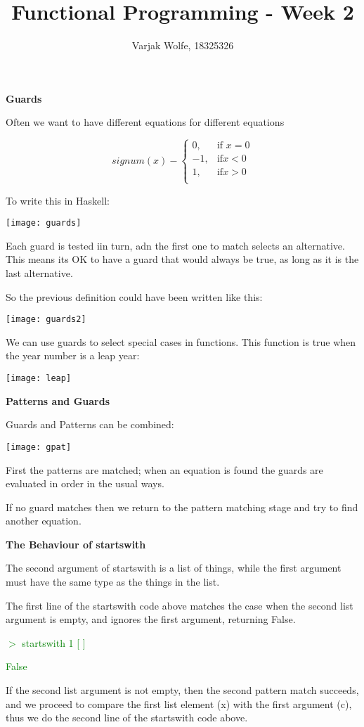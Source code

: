 \documentclass{article}
\title{Functional Programming - Week 2}
\author{Varjak Wolfe, 18325326}
\begin{document}
\textbf{Guards}

Often we want to have different equations for different equations

\[
    signum(x) -
\begin{cases}
    0,		& \text{if } x = 0\\
    -1,             & \text{if} x < 0\\
    1,              & \text{if} x > 0\\
\end{cases}
\]

To write this in Haskell:

\texttt{[image: guards]}

Each guard is tested iin turn, adn the first one to match selects an alternative. This means its OK to have a guard that would always be true, as long as it is the last alternative.

So the previous definition could have been written like this:

\texttt{[image: guards2]}


We can use guards to select special cases in functions. This function is true when the year number is a leap year:

\texttt{[image: leap]}


\textbf{Patterns and Guards}

Guards and Patterns can be combined:

\texttt{[image: gpat]}

First the patterns are matched; when an equation is found the guards are evaluated in order in the usual ways.

If no guard matches then we return to the pattern matching stage and try to find another equation.


\textbf{The Behaviour of startswith}

The second argument of startswith is a list of things, while the first argument must have the same type as the things in the list.

The first line of the startswith code above matches the case when the second list argument is empty, and ignores the first argument, returning False.

\textcolor{green}{$>$ startswith 1 [ ]}

\textcolor{green}{False}

If the second list argument is not empty, then the second pattern match succeeds, and we proceed to compare the first list element (x) with the first argument (c), thus we do the second line of the startswith code above.
\end{document}
